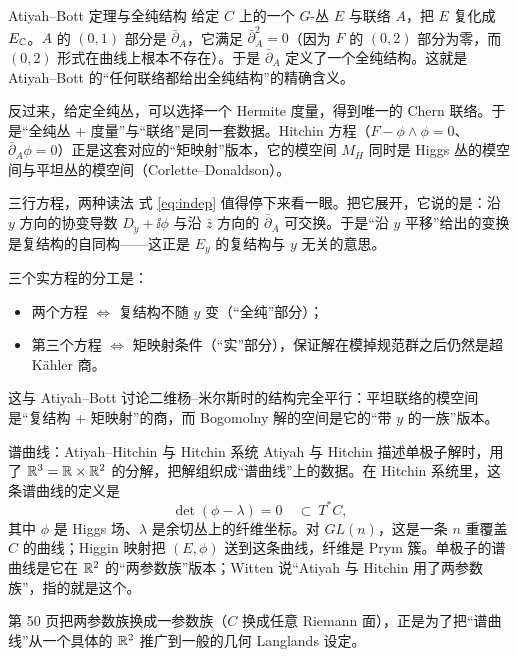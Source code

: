 \begin{pizhu}{Atiyah--Bott 定理与全纯结构}
给定 $C$ 上的一个 $G$-丛 $E$ 与联络 $A$，把 $E$ 复化成 $E_{\mathbb{C}}$。$A$ 的 $(0,1)$ 部分是 $\bar\partial_A$，它满足 $\bar\partial_A^2=0$（因为 $F$ 的 $(0,2)$ 部分为零，而 $(0,2)$ 形式在曲线上根本不存在）。于是 $\bar\partial_A$ 定义了一个全纯结构。这就是 Atiyah--Bott 的“任何联络都给出全纯结构”的精确含义。

反过来，给定全纯丛，可以选择一个 Hermite 度量，得到唯一的 Chern 联络。于是“全纯丛 + 度量”与“联络”是同一套数据。Hitchin 方程（$F-\phi\wedge\phi=0$、$\bar\partial_A\phi=0$）正是这套对应的“矩映射”版本，它的模空间 $M_H$ 同时是 Higgs 丛的模空间与平坦丛的模空间（Corlette--Donaldson）。
\end{pizhu}

\begin{pizhu}{三行方程，两种读法}
式 \eqref{eq:indep} 值得停下来看一眼。把它展开，它说的是：沿 $y$ 方向的协变导数 $D_y+\ii\phi$ 与沿 $\bar z$ 方向的 $\bar\partial_A$ 可交换。于是“沿 $y$ 平移”给出的变换是复结构的自同构——这正是 $E_y$ 的复结构与 $y$ 无关的意思。

三个实方程的分工是：
\begin{itemize}
  \item 两个方程 $\Leftrightarrow$ 复结构不随 $y$ 变（“全纯”部分）；
  \item 第三个方程 $\Leftrightarrow$ 矩映射条件（“实”部分），保证解在模掉规范群之后仍然是超 Kähler 商。
\end{itemize}
这与 Atiyah--Bott 讨论二维杨--米尔斯时的结构完全平行：平坦联络的模空间是“复结构 + 矩映射”的商，而 Bogomolny 解的空间是它的“带 $y$ 的一族”版本。
\end{pizhu}

\begin{pizhu}{谱曲线：Atiyah--Hitchin 与 Hitchin 系统}
Atiyah 与 Hitchin 描述单极子解时，用了 $\mathbb{R}^3=\mathbb{R}\times\mathbb{R}^2$ 的分解，把解组织成“谱曲线”上的数据。在 Hitchin 系统里，这条谱曲线的定义是
\[
  \det(\phi-\lambda)=0\quad\subset\ T^*C ,
\]
其中 $\phi$ 是 Higgs 场、$\lambda$ 是余切丛上的纤维坐标。对 $GL(n)$，这是一条 $n$ 重覆盖 $C$ 的曲线；Higgin 映射把 $(E,\phi)$ 送到这条曲线，纤维是 Prym 簇。单极子的谱曲线是它在 $\mathbb{R}^2$ 的“两参数族”版本；Witten 说“Atiyah 与 Hitchin 用了两参数族”，指的就是这个。

第 50 页把两参数族换成一参数族（$C$ 换成任意 Riemann 面），正是为了把“谱曲线”从一个具体的 $\mathbb{R}^2$ 推广到一般的几何 Langlands 设定。
\end{pizhu}

